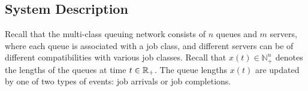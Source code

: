 \subsection{System Description}
Recall that the multi-class queuing network consists of $n$ queues and $m$ servers, where each queue is associated with a job class, and different servers can be of different compatibilities with various job classes. Recall that $x(t)\in\mathbb{N}_{+}^{n}$ denotes the lengths of the queues at time $t \in \mathbb{R}_{+}$.
%
The queue lengths $x(t)$ are updated by one of two types of events: job arrivals or job completions. 
